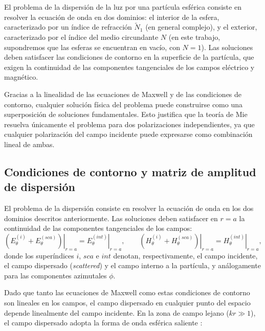 
El problema de la dispersión de la luz por una partícula esférica consiste en
resolver la ecuación de onda en dos dominios: el interior de la esfera,
caracterizado por un índice de refracción $\tilde{N}_1$ (en general complejo), y el
exterior, caracterizado por el índice del medio circundante $N$ (en este
trabajo, supondremos que las esferas se encuentran en vacío, con $N = 1$). 
Las soluciones deben satisfacer las condiciones de
contorno en la superficie de la partícula, que exigen la continuidad de las
componentes tangenciales de los campos eléctrico y magnético.

Gracias a la linealidad de las ecuaciones de Maxwell y de las condiciones de
contorno, cualquier solución física del problema puede construirse como una
superposición de soluciones fundamentales. Esto justifica que la teoría de Mie
resuelva únicamente el problema para dos polarizaciones independientes, ya que
cualquier polarización del campo incidente puede expresarse como combinación
lineal de ambas.

\subsection{Condiciones de contorno y matriz de amplitud de dispersión}

El problema de la dispersión consiste en resolver la ecuación de onda en los
dos dominios descritos anteriormente. Las soluciones deben satisfacer en
$r\!=\!a$ la continuidad de las componentes tangenciales de los campos:
\begin{equation}
  \left.(E_\theta^{(i)} + E_\theta^{(sca)})\right|_{r=a}
  = \left.E_\theta^{(int)}\right|_{r=a},
  \qquad
  \left.(H_\theta^{(i)} + H_\theta^{(sca)})\right|_{r=a}
  = \left.H_\theta^{(int)}\right|_{r=a},
\end{equation}
donde los superíndices $i$, $sca$ e $int$ denotan,
respectivamente, el campo incidente, el campo dispersado (\textit{scattered})
y el campo interno a la partícula, y análogamente para las componentes
azimutales $\phi$.

Dado que tanto las ecuaciones de Maxwell como estas condiciones de contorno son
lineales en los campos, el campo dispersado en cualquier punto del espacio
depende linealmente del campo incidente. En la zona de campo lejano
($kr \gg 1$), el campo dispersado adopta la forma de onda esférica saliente
\cite[p.~270]{Jackson1975}:

